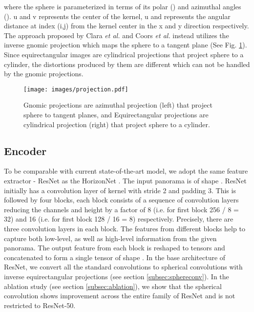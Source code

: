 \documentclass[final]{cvpr}
\begin{document}
\small




where the sphere is parameterized in terms of its polar () and azimuthal angles (). u and v represents the center of the kernel,  u and  represents the angular distance at index (i,j) from the kernel center in the x and y direction respectively. The approach proposed by Clara \textit{et al.} \cite{fernandez2020corners} and Coors \textit{et al.} \cite{coors2018spherenet} instead utilizes the inverse gnomic projection which maps the sphere to a tangent plane (See Fig. \ref{fig:projection}).
Since equirectangular images are cylindrical projections that project sphere to a cylinder, the distortions produced by them are different which can not be handled by the gnomic projections.








\begin{figure}
    \centering
    \texttt{[image: images/projection.pdf]}
    \caption{Gnomic projections are azimuthal projection (left) that project sphere to tangent planes, and Equirectangular projections are cylindrical projection (right) that project sphere to a cylinder.}
    \label{fig:projection}
\end{figure}



\subsection{Encoder}\label{subsec:enc}
To be comparable with current state-of-the-art model, we adopt the same feature extractor - ResNet \cite{he2016deep} as the HorizonNet \cite{sun2019horizonnet}. The input panorama is of shape \textit{}. ResNet initially has a convolution layer of  kernel with stride 2 and padding 3. This is followed by four blocks, each block consists of a sequence of convolution layers reducing the channels and height by a factor of 8 (i.e. for first block 256 / 8 = 32) and 16 (i.e. for first block 128 / 16 = 8) respectively. Precisely, there are three convolution layers in each block. The features from different blocks help to capture both low-level, as well as high-level information \cite{kumar2020noisy} from the given panorama. The output feature from each block is reshaped to \textit{} tensors and concatenated to form a single tensor of shape \textit{}. In the base architecture of ResNet, we convert all the standard convolutions to spherical convolutions with inverse equirectangular projections (see section \ref{subsec:sphereconv}). In the ablation study (see section \ref{subsec:ablation}), we show that the spherical convolution shows improvement across the entire family of ResNet and is not restricted to ResNet-50. 
\end{document}
